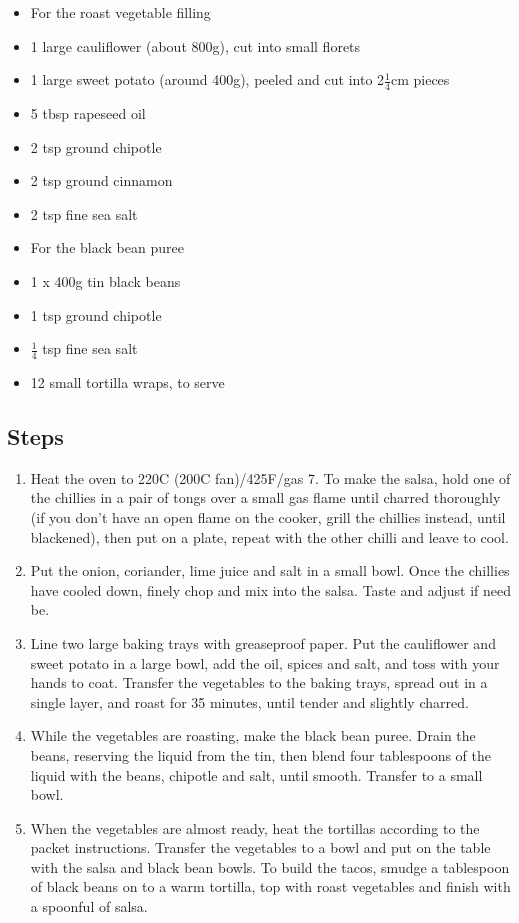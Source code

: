 \documentclass{book}
\begin{document}
\begin{itemize}
\item For the roast vegetable filling 
\item 1 large cauliflower (about 800g), cut into small florets 
\item 1 large sweet potato (around 400g), peeled and cut into 2$\frac{1}{4}$cm pieces 
\item 5 tbsp rapeseed oil 
\item 2 tsp ground chipotle 
\item 2 tsp ground cinnamon 
\item 2 tsp fine sea salt
\end{itemize}

\begin{itemize}
\item For the black bean puree 
\item 1 x 400g tin black beans 
\item 1 tsp ground chipotle 
\item $\frac{1}{4}$ tsp fine sea salt 
\item 12 small tortilla wraps, to serve
\end{itemize}

\subsection*{Steps}
\begin{enumerate}
\item Heat the oven to 220C (200C fan)/425F/gas 7. To make the salsa, hold one of the chillies in a pair of tongs over a small gas flame until charred thoroughly (if you don’t have an open flame on the cooker, grill the chillies instead, until blackened), then put on a plate, repeat with the other chilli and leave to cool.
\item Put the onion, coriander, lime juice and salt in a small bowl. Once the chillies have cooled down, finely chop and mix into the salsa. Taste and adjust if need be.
\item Line two large baking trays with greaseproof paper. Put the cauliflower and sweet potato in a large bowl, add the oil, spices and salt, and toss with your hands to coat. Transfer the vegetables to the baking trays, spread out in a single layer, and roast for 35 minutes, until tender and slightly charred.
\item While the vegetables are roasting, make the black bean puree. Drain the beans, reserving the liquid from the tin, then blend four tablespoons of the liquid with the beans, chipotle and salt, until smooth. Transfer to a small bowl.
\item When the vegetables are almost ready, heat the tortillas according to the packet instructions. Transfer the vegetables to a bowl and put on the table with the salsa and black bean bowls. To build the tacos, smudge a tablespoon of black beans on to a warm tortilla, top with roast vegetables and finish with a spoonful of salsa.
\end{enumerate}
\newpage
\end{document}
